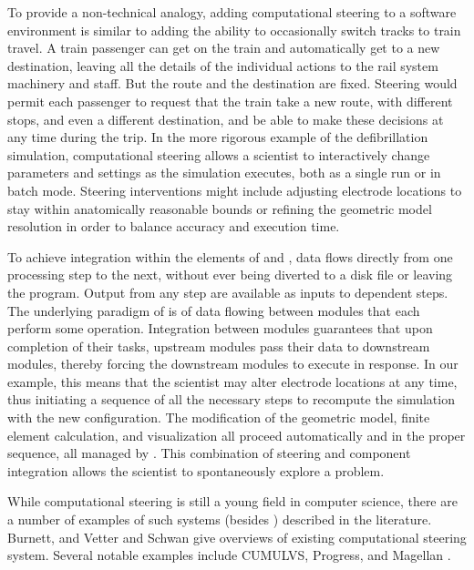 To provide a non-technical analogy, adding computational steering to a
software environment is similar to adding the ability to occasionally
switch tracks to train travel.  A train passenger can get on the train and
automatically get to a new destination, leaving all the details of the
individual actions to the rail system machinery and staff.  But the route
and the destination are fixed.  Steering would permit each passenger to
request that the train take a new route, with different stops, and even a
different destination, and be able to make these decisions at any time
during the trip.  In the more rigorous example of the defibrillation
simulation, computational steering allows a scientist to interactively
change parameters and settings as the simulation executes, both as a single
run or in batch mode.  Steering interventions might include adjusting
electrode locations to stay within anatomically reasonable bounds or
refining the geometric model resolution in order to balance accuracy and
execution time.

To achieve integration within the elements of \SR{} and \PSE{}, data 
flows directly from one processing step to the next, without ever being
diverted to a disk file or leaving the program.  Output from any step 
are available as inputs to dependent steps.  The underlying paradigm of
\SR{} is of data flowing between modules that each perform some
operation.  Integration between modules guarantees that upon completion of
their tasks, upstream modules pass their data to downstream modules,
thereby forcing the downstream modules to execute in response.  In our
example, this means that the scientist may alter electrode locations at any
time, thus initiating a sequence of all the necessary steps to recompute
the simulation with the new configuration.  The modification of the
geometric model, finite element calculation, and visualization all proceed
automatically and in the proper sequence, all managed by \SR{}.  This
combination of steering and component integration allows the scientist
to spontaneously explore a problem.  

While computational steering is still a young field in computer science,
there are a number of examples of such systems (besides \SR{}) described in
the literature.  Burnett\cite{MM:Bur94}, and Vetter and
Schwan\cite{MM:Vet96} give overviews of existing computational steering
system.  Several notable examples include CUMULVS\cite{MM:Gei96,MM:Koh97},
 Progress\cite{MM:Vet95},  and
Magellan\cite{MM:Vet97a} .



